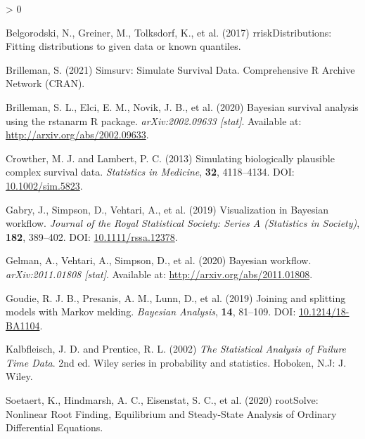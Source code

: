 \documentclass[
  10pt,
  a4paper,
]{article}
\newlength{\cslhangindent}
\newenvironment{CSLReferences}[2] %
 {%
  \setlength{\parindent}{0pt}
  \ifodd #1 \everypar{\setlength{\hangindent}{\cslhangindent}}\ignorespaces\fi
  \ifnum #2 > 0
  \setlength{\parskip}{#2\baselineskip}
  \fi
 }%
 {}
\begin{document}
\hypertarget{refs}{}
\begin{CSLReferences}{1}{0}
\leavevmode\hypertarget{ref-belgorodski_rriskdistributions_2017}{}%
Belgorodski, N., Greiner, M., Tolksdorf, K., et al. (2017)
{rriskDistributions}: {Fitting} distributions to given data or known
quantiles.

\leavevmode\hypertarget{ref-brilleman_simsurv_2021}{}%
Brilleman, S. (2021) Simsurv: {Simulate Survival Data}. Comprehensive R
Archive Network (CRAN).

\leavevmode\hypertarget{ref-brilleman_bayesian_2020}{}%
Brilleman, S. L., Elci, E. M., Novik, J. B., et al. (2020) Bayesian
survival analysis using the rstanarm {R} package. \emph{arXiv:2002.09633
{[}stat{]}}. Available at: \url{http://arxiv.org/abs/2002.09633}.

\leavevmode\hypertarget{ref-crowther_simulating_2013}{}%
Crowther, M. J. and Lambert, P. C. (2013) Simulating biologically
plausible complex survival data. \emph{Statistics in Medicine},
\textbf{32}, 4118--4134. DOI:
\href{https://doi.org/10.1002/sim.5823}{10.1002/sim.5823}.

\leavevmode\hypertarget{ref-gabry_visualization_2019}{}%
Gabry, J., Simpson, D., Vehtari, A., et al. (2019) Visualization in
{Bayesian} workflow. \emph{Journal of the Royal Statistical Society:
Series A (Statistics in Society)}, \textbf{182}, 389--402. DOI:
\href{https://doi.org/10.1111/rssa.12378}{10.1111/rssa.12378}.

\leavevmode\hypertarget{ref-gelman_bayesian_2020}{}%
Gelman, A., Vehtari, A., Simpson, D., et al. (2020) Bayesian workflow.
\emph{arXiv:2011.01808 {[}stat{]}}. Available at:
\url{http://arxiv.org/abs/2011.01808}.

\leavevmode\hypertarget{ref-goudie_joining_2019}{}%
Goudie, R. J. B., Presanis, A. M., Lunn, D., et al. (2019) Joining and
splitting models with {Markov} melding. \emph{Bayesian Analysis},
\textbf{14}, 81--109. DOI:
\href{https://doi.org/10.1214/18-BA1104}{10.1214/18-BA1104}.

\leavevmode\hypertarget{ref-kalbfleisch_statistical_2002}{}%
Kalbfleisch, J. D. and Prentice, R. L. (2002) \emph{The Statistical
Analysis of Failure Time Data}. 2nd ed. Wiley series in probability and
statistics. {Hoboken, N.J}: {J. Wiley}.

\leavevmode\hypertarget{ref-soetaert_rootsolve_2020}{}%
Soetaert, K., Hindmarsh, A. C., Eisenstat, S. C., et al. (2020)
{rootSolve}: {Nonlinear Root Finding}, {Equilibrium} and {Steady}-{State
Analysis} of {Ordinary Differential Equations}.

\end{CSLReferences}
\end{document}
